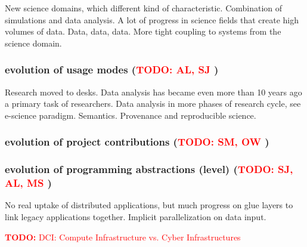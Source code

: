 \documentclass{article}
\newcommand{\B}[1]{\textbf{#1}}
\newcommand{\todo}[1]{{\textcolor{red}{\B{TODO:} #1 }}}
\begin{document}
 New science domains, which different kind of characteristic.
 Combination of simulations and data analysis. A lot of progress in
 science fields that create high volumes of data.  Data, data, data.
 More tight coupling to systems from the science domain.
 
 \subsubsection{ evolution of usage modes (\todo{AL, SJ})}
 
 Research moved to desks. Data analysis has became even more than 10
 years ago a primary task of researchers.  Data analysis in more
 phases of research cycle, see e-science paradigm.  Semantics.
 Provenance and reproducible science.
  
 \subsubsection{ evolution of project contributions (\todo{SM, OW})}
 
 \subsubsection{ evolution of programming abstractions (level) (\todo{SJ, AL, MS})}
 
 No real uptake of distributed applications, but much progress on glue
 layers to link legacy applications together.  Implicit
 parallelization on data input.


\newpage

\todo{DCI: Compute Infrastructure vs. Cyber Infrastructures}

\footnotesize


\end{document}
